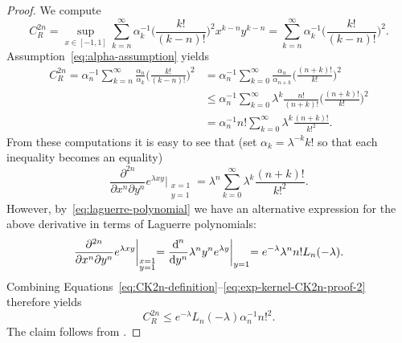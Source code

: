 \documentclass{mcom-l}
\numberwithin{equation}{section}
\numberwithin{theorem}{section} %
\begin{document}
\begin{proof}
  We compute
  \begin{equation*}
      C_{R}^{2n} = \sup_{x \in [-1, 1]} \sum_{k=n}^\infty \alpha_k^{-1} \bigg(\frac{k!}{(k - n)!}\bigg)^2 x^{k-n} y^{k-n} = \sum_{k=n}^\infty \alpha_k^{-1} \bigg(\frac{k!}{(k - n)!}\bigg)^2.
  \end{equation*}
  Assumption~\eqref{eq:alpha-assumption} yields
  \begin{equation} \label{eq:CK2n-definition}
    \begin{split}
      C_{R}^{2n} = \alpha_n^{-1} \sum_{k=n}^\infty \frac{\alpha_n}{\alpha_k} \bigg(\frac{k!}{(k - n)!}\bigg)^2 &= \alpha_n^{-1} \sum_{k=0}^\infty \frac{\alpha_n}{\alpha_{n+k}} \bigg(\frac{(n + k)!}{k!}\bigg)^2 \\
      &\leq \alpha_n^{-1} \sum_{k=0}^\infty \lambda^k \frac{n!}{(n + k)!} \bigg(\frac{(n + k)!}{k!}\bigg)^2 \\
      &= \alpha_n^{-1} n! \sum_{k=0}^\infty \lambda^k \frac{(n + k)!}{k!^2}.
      \end{split}
  \end{equation}
  From these computations it is easy to see that (set $\alpha_k = \lambda^{-k} k!$ so that each inequality becomes an equality)
  \begin{equation} \label{eq:exp-kernel-CK2n-proof-1}
    \frac{\partial^{2n}}{\partial x^n \partial y^n} e^{\lambda xy} \biggl|_{\substack{x = 1 \\ y = 1}} = \lambda^n \sum_{k=0}^\infty \lambda^k \frac{(n + k)!}{k!^2}.
  \end{equation}
  However, by~\eqref{eq:laguerre-polynomial} we have an alternative expression for the above derivative in terms of Laguerre polynomials:
  \begin{equation} \label{eq:exp-kernel-CK2n-proof-2}
    \frac{\partial^{2n}}{\partial x^n \partial y^n} e^{\lambda xy} \biggl|_{\substack{x = 1 \\ y = 1}} = \frac{\dif^{\, n}}{\dif y^n} \lambda^n y^n e^{\lambda y} \biggl|_{y = 1} = e^{-\lambda} \lambda^n n! L_n(-\lambda).
  \end{equation}
  Combining Equations~\eqref{eq:CK2n-definition}--\eqref{eq:exp-kernel-CK2n-proof-2} therefore yields
  \begin{equation*}
    C_R^{2n} \leq e^{-\lambda} L_n(-\lambda) \alpha_n^{-1} n!^2.
  \end{equation*}
  The claim follows from .
\end{proof}
\end{document}
